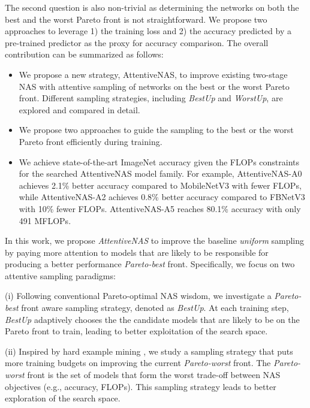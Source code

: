 \documentclass[final]{cvpr}
\theoremstyle{definition}
\begin{document}
The second question is also non-trivial as determining the networks on both the best and the worst Pareto front is not straightforward.
We propose two approaches to leverage 1) the training loss and 2) the accuracy predicted by a pre-trained predictor as the proxy for accuracy comparison. The overall contribution can be summarized as follows:
\begin{itemize}
    \item We propose a new strategy, AttentiveNAS, to improve existing two-stage NAS with attentive sampling of networks on the best or the worst Pareto front. Different sampling strategies, including \textit{BestUp} and \textit{WorstUp}, are explored and compared in detail.
    \item We propose two approaches to guide the sampling to the best or the worst Pareto front efficiently during training.
    \item We achieve state-of-the-art ImageNet accuracy given the FLOPs constraints for the searched AttentiveNAS model family. For example, AttentiveNAS-A0 achieves 2.1\% better accuracy compared to MobileNetV3 with fewer FLOPs, while AttentiveNAS-A2 achieves 0.8\% better accuracy compared to FBNetV3 with 10\% fewer FLOPs. AttentiveNAS-A5 reaches 80.1\% accuracy with only 491 MFLOPs.
\end{itemize}

\iffalse
In this work, 
we propose \emph{AttentiveNAS} to improve the baseline \textit{uniform} sampling by paying more attention to models that are likely to be responsible for producing a better performance \emph{Pareto-best} front. 
Specifically, we focus on two attentive sampling paradigms: 

(i) 
Following conventional Pareto-optimal NAS \cite[e.g.,]{liu2018darts, cai2018proxylessnas, cheng2018searching, chin2020pareco} wisdom, 
we investigate a \emph{Pareto-best} front aware sampling strategy, 
denoted as \textit{BestUp}.
At each training step, \textit{BestUp} adaptively chooses the the candidate models that are likely to be on the Pareto front to train,  
leading to better exploitation of the search space. 

(ii) 
Inspired by hard example mining \cite[e.g.,]{smirnov2018hard, gong2020maxup}, 
we study a sampling strategy that puts more training budgets on 
improving the current \emph{Pareto-worst} front.  
The \emph{Pareto-worst} front is the set of models that
form the worst trade-off between NAS objectives (e.g., accuracy, FLOPs). 
This sampling strategy leads to better exploration of the search space. 
\end{document}
